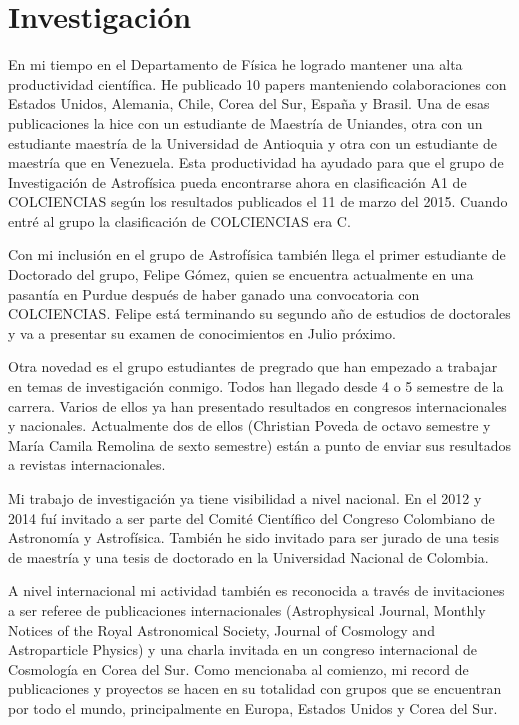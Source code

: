 \documentclass{report}
\begin{document}
\section{Investigación}

En mi tiempo en el Departamento de Física he logrado mantener una alta
productividad científica. He publicado 10 papers manteniendo
colaboraciones con Estados Unidos, Alemania, Chile, Corea del Sur,
España y Brasil. Una de esas publicaciones la hice con un estudiante
de Maestría de Uniandes, otra con un estudiante maestría de la
Universidad de Antioquia y otra con un estudiante de maestría que en
Venezuela. Esta productividad ha ayudado para que el grupo de
Investigación de Astrofísica pueda encontrarse ahora en clasificación
A1 de COLCIENCIAS según los resultados publicados el 11 de marzo del
2015. Cuando entré al grupo la clasificación de COLCIENCIAS era C.  

Con mi inclusión en el grupo de Astrofísica también llega el primer
estudiante de Doctorado del grupo, Felipe Gómez, quien se encuentra
actualmente en una pasantía en Purdue después de haber ganado una
convocatoria con COLCIENCIAS. Felipe está terminando su segundo año de
estudios de doctorales y va a presentar su examen de conocimientos en
Julio próximo. 

Otra novedad es el grupo estudiantes de pregrado que han empezado a
trabajar en temas de investigación conmigo. Todos han llegado desde 4
o 5 semestre de la carrera. Varios de ellos ya han presentado
resultados en congresos internacionales y nacionales. Actualmente dos
de ellos (Christian Poveda de octavo semestre y María Camila Remolina
de sexto semestre) están a punto de enviar sus resultados a revistas
internacionales.  

Mi trabajo de investigación ya tiene visibilidad a nivel nacional. En
el 2012 y 2014 fuí invitado a ser parte del Comité Científico del
Congreso Colombiano de Astronomía y Astrofísica. También he sido
invitado para ser jurado de una tesis de maestría y una tesis de
doctorado en la Universidad Nacional de Colombia.  

A nivel internacional mi actividad también es reconocida a través de
invitaciones a ser referee de publicaciones internacionales
(Astrophysical Journal, Monthly Notices of the Royal Astronomical
Society, Journal of Cosmology and Astroparticle Physics) y una charla
invitada en un congreso internacional de Cosmología en Corea del
Sur. Como mencionaba al comienzo, mi record de publicaciones y
proyectos se hacen en su totalidad con grupos que se encuentran por
todo el mundo, principalmente en Europa, Estados Unidos y Corea del
Sur. 
\end{document}
